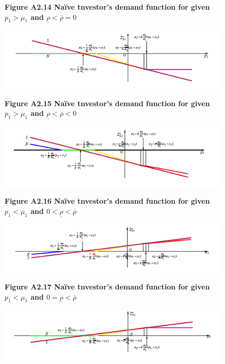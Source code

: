 \documentclass[10.0pt]{article}
\begin{document}
\begin{figure}
\centerline{\bf Figure A2.14 \quad Na\"ive tnvestor's demand function for given $ p_1 > \mu_1 $ and $ \underline{\rho} < \overline{\rho} = 0 $}
	\centering
	\includegraphics[width=1.0 \textwidth]{FigureA2.14.png}
\end{figure}



\begin{figure}
\centerline{\bf Figure A2.15 \quad Na\"ive tnvestor's demand function for given $ p_1 > \mu_1 $ and $ \underline{\rho} < \overline{\rho} < 0 $}
	\centering
	\includegraphics[width=1.0 \textwidth]{FigureA2.15.png}
\end{figure}

\newpage


\begin{figure}
\centerline{\bf Figure A2.16 \quad Na\"ive tnvestor's demand function for given $ p_1 < \mu_1 $ and $ 0 < \underline{\rho} < \overline{\rho} $}
	\centering
	\includegraphics[width=1.0 \textwidth]{FigureA2.16.png}
\end{figure}



\begin{figure}
\centerline{\bf Figure A2.17 \quad Na\"ive tnvestor's demand function for given $ p_1 < \mu_1 $ and $ 0 = \underline{\rho} < \overline{\rho} $}
	\centering
	\includegraphics[width=1.0 \textwidth]{FigureA2.17.png}
\end{figure}
\end{document}
